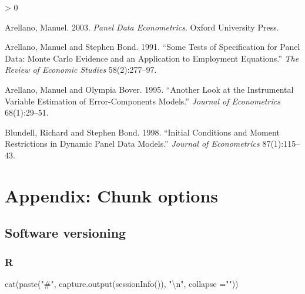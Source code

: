\documentclass[
  12pt,
]{article}
\newenvironment{Shaded}{\begin{snugshade}}{\end{snugshade}}
\newcommand{\AttributeTok}[1]{\textcolor[rgb]{0.77,0.63,0.00}{#1}}
\newcommand{\FunctionTok}[1]{\textcolor[rgb]{0.00,0.00,0.00}{#1}}
\newcommand{\NormalTok}[1]{#1}
\newcommand{\SpecialCharTok}[1]{\textcolor[rgb]{0.00,0.00,0.00}{#1}}
\newcommand{\StringTok}[1]{\textcolor[rgb]{0.31,0.60,0.02}{#1}}
\newlength{\cslhangindent}
\newenvironment{CSLReferences}[2] %
 {%
  \setlength{\parindent}{0pt}
  \ifodd #1 \everypar{\setlength{\hangindent}{\cslhangindent}}\ignorespaces\fi
  \ifnum #2 > 0
  \setlength{\parskip}{#2\baselineskip}
  \fi
 }%
 {}
\begin{document}
\hypertarget{refs}{}
\begin{CSLReferences}{1}{0}
\leavevmode\hypertarget{ref-arellano2003panel}{}%
Arellano, Manuel. 2003. \emph{Panel Data Econometrics}. Oxford University Press.

\leavevmode\hypertarget{ref-arellano1991some}{}%
Arellano, Manuel and Stephen Bond. 1991. {``Some Tests of Specification for Panel Data: Monte Carlo Evidence and an Application to Employment Equations.''} \emph{The Review of Economic Studies} 58(2):277--97.

\leavevmode\hypertarget{ref-arellano1995another}{}%
Arellano, Manuel and Olympia Bover. 1995. {``Another Look at the Instrumental Variable Estimation of Error-Components Models.''} \emph{Journal of Econometrics} 68(1):29--51.

\leavevmode\hypertarget{ref-bb98}{}%
Blundell, Richard and Stephen Bond. 1998. {``Initial Conditions and Moment Restrictions in Dynamic Panel Data Models.''} \emph{Journal of Econometrics} 87(1):115--43.

\end{CSLReferences}

\hypertarget{appendix-chunk-options}{%
\section*{Appendix: Chunk options}\label{appendix-chunk-options}}

\hypertarget{software-versioning}{%
\subsection{Software versioning}\label{software-versioning}}

\hypertarget{r-1}{%
\subsubsection{R}\label{r-1}}

\begin{Shaded}
\begin{Highlighting}[]
\FunctionTok{cat}\NormalTok{(}\FunctionTok{paste}\NormalTok{(}\StringTok{"\#"}\NormalTok{, }\FunctionTok{capture.output}\NormalTok{(}\FunctionTok{sessionInfo}\NormalTok{()), }\StringTok{"}\SpecialCharTok{\textbackslash{}n}\StringTok{"}\NormalTok{, }\AttributeTok{collapse =}\StringTok{""}\NormalTok{))}
\end{Highlighting}
\end{Shaded}
\end{document}
